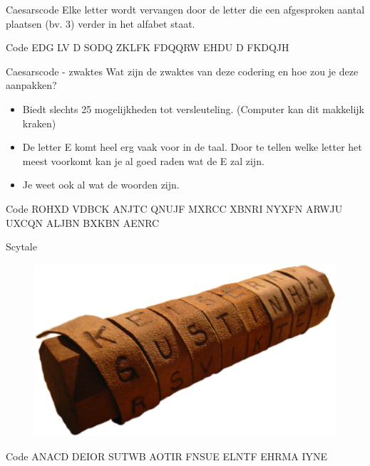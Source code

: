 \documentclass{beamer}
\begin{document}
\begin{frame}[fragile]{Caesarscode}
	Elke letter wordt vervangen door de letter die een afgesproken aantal plaatsen (bv. 3) verder in het alfabet staat. 
	

	\begin{block}{Code}
	EDG LV D SODQ ZKLFK FDQQRW EHDU D FKDQJH
	\end{block}

\end{frame}

\begin{frame}[fragile]{Caesarscode - zwaktes}
	Wat zijn de zwaktes van deze codering en hoe zou je deze aanpakken?
	\pause
	\begin{itemize}
		\item Biedt slechts 25 mogelijkheden tot versleuteling. (Computer kan dit makkelijk kraken)
		\item De letter E komt heel erg vaak voor in de taal. Door te tellen welke letter het meest voorkomt kan je al goed raden wat de E zal zijn. 
		\item Je weet ook al wat de woorden zijn.
	\end{itemize}

\begin{center}
	\begin{block}{Code}
ROHXD VDBCK ANJTC QNUJF MXRCC XBNRI
NYXFN ARWJU UXCQN ALJBN BXKBN AENRC
\end{block}
\end{center}
\end{frame}

\begin{frame}[fragile]{Scytale}
	\begin{figure}
		\includegraphics[width=\textwidth]{img/scytale}
	\end{figure}

\begin{block}{Code}
	ANACD DEIOR SUTWB AOTIR FNSUE ELNTF EHRMA IYNE
\end{block}

\end{frame}
\end{document}
